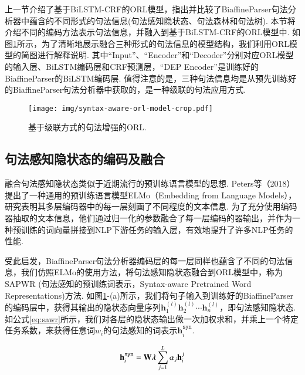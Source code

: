 上一节介绍了基于BiLSTM-CRF的ORL模型，指出并比较了BiaffineParser句法分析器中蕴含的不同形式的句法信息(句法感知隐状态、句法森林和句法树).
本节将介绍不同的编码方法表示句法信息，并融入到基于BiLSTM-CRF的ORL模型中.
如图\ref{fig:orl_pipeline}所示，为了清晰地展示融合三种形式的句法信息的模型结构，我们利用ORL模型的简图进行解释说明. 其中“Input”、“Encoder”和“Decoder”分别对应ORL模型的输入层、BiLSTM编码层和CRF预测层，“DEP Encoder”是训练好的BiaffineParser的BiLSTM编码层.
值得注意的是，三种句法信息均是从预先训练好的BiaffineParser句法分析器中获取的，是一种级联的句法应用方式.

\begin{figure}[hb!]
    \centering
    \texttt{[image: img/syntax-aware-orl-model-crop.pdf]}
    \caption{基于级联方式的句法增强的ORL. }
    \label{fig:orl_pipeline}
\end{figure}
\subsection{句法感知隐状态的编码及融合}
融合句法感知隐状态类似于近期流行的预训练语言模型的思想. Peters等（2018）提出了一种通用的预训练语言模型ELMo（Embedding from Language Models），研究表明其多层编码器中的每一层刻画了不同程度的文本信息. 为了充分使用编码器抽取的文本信息，他们通过归一化的参数融合了每一层编码的器输出，并作为一种预训练的词向量拼接到NLP下游任务的输入层，有效地提升了许多NLP任务的性能.

受此启发，BiaffineParser句法分析器编码层的每一层同样也蕴含了不同的句法信息，我们仿照ELMo的使用方法，将句法感知隐状态融合到ORL模型中，称为SAPWR (句法感知的预训练词表示，Syntax-aware Pretrained Word Representations)方法. 如图\ref{fig:orl_pipeline}-(a)所示，我们将句子输入到训练好的BiaffineParser的编码层中，获得其输出的隐状态向量序列$\mathbf{h}_1^{(l)}\mathbf{h}_2^{(l)} \cdots \mathbf{h}_n^{(l)}$，即句法感知隐状态. 如公式\ref{eq:sawr}所示，我们对各层的隐状态输出做一次加权求和，并乘上一个特定任务系数，来获得任意词$w_i$的句法感知的词表示$\mathbf{h}_i^{\texttt{syn}}$.


\begin{equation}
    \setlength{\abovedisplayskip}{9pt}
    \setlength{\belowdisplayskip}{9pt}
    \label{eq:sawr}
    \mathbf{h}_i^{\texttt{syn}} = \mathbf{W} \lambda \sum_{j=1}^{L}\alpha_j \mathbf{h}_i^j
\end{equation}

